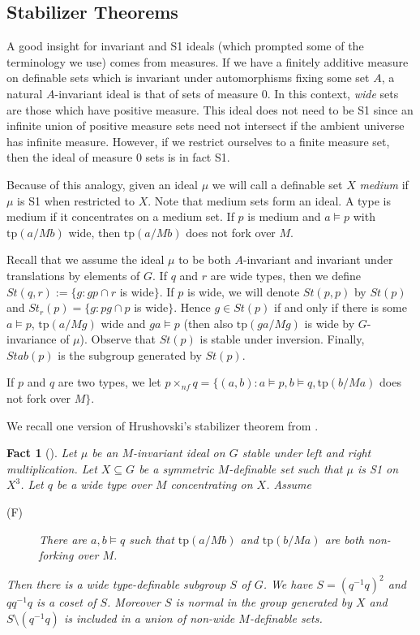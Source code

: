 \documentclass[12pt]{article}
\newtheorem{fact}[thm]{Fact}
\theoremstyle{definition}
\theoremstyle{mystyle}
\theoremstyle{remark}
\newcommand{\tp}{\mathrm{tp}}
\newcommand{\nf}{\times_{nf}}
\begin{document}
\subsection{Stabilizer Theorems}


A good insight for invariant and S1 ideals (which prompted some of
the terminology we use) comes from measures. If we have a finitely
additive measure on definable sets which is invariant under
automorphisms fixing some set $A$, a natural $A$-invariant ideal
is that of sets of measure 0. In this context, \emph{wide} sets
are those which have positive measure. This ideal does not need to
be S1 since an infinite union of positive measure sets need not
intersect if the ambient universe has infinite measure. However,
if we restrict ourselves to a finite measure set, then the ideal
of measure 0 sets is in fact S1.

Because of this analogy, given an ideal $\mu$ we will call a definable set $X$ \emph{medium}
if  $\mu$ is S1 when restricted to $X$. Note that medium sets form an ideal.
A type is medium if it concentrates on a medium set. If
$p$ is medium and $a\models p$ with
$\tp(a/Mb)$ wide, then $\tp(a/Mb)$ does not fork over $M$.

\bigskip

Recall that we assume the ideal $\mu$
to be both $A$-invariant and invariant under translations by elements of $G$.
If $q$ and $r$ are wide types, then we define $St(q,r):=\{g : gp
\cap r$ is wide$\}$. If $p$ is wide, we will denote $St(p,p)$ by
$St(p)$ and $St_r(p)= \{g : pg\cap p$ is wide$\}$. Hence $g\in
St(p)$ if and only if there is some $a\models p$, $\tp(a/Mg)$ wide
and $ga\models p$ (then also $\tp(ga/Mg)$ is wide by
$G$-invariance of $\mu$). Observe that $St(p)$ is stable under
inversion. Finally, $Stab(p)$ is the subgroup generated by
$St(p)$.

If $p$ and $q$ are two types, we let $p\nf q=\{(a,b) : a\models p, b\models q, \tp(b/Ma)$ does not fork over $M\}$.

\smallskip
We recall one version of Hrushovski's stabilizer theorem from
\cite{Hru12}.

\begin{fact}[\cite{Hru12}]\label{fact_stab}
Let $\mu$ be an $M$-invariant ideal on $G$ stable under left and right multiplication. Let $X\subseteq G$ be a symmetric $M$-definable set such that $\mu$ is S1 on $X^3$. Let $q$ be a wide type over $M$ concentrating on $X$. Assume

\begin{description}
\item[(F)] There are $a,b \models q$ such that $\tp(a/Mb)$ and $\tp(b/Ma)$ are both non-forking over $M$.
\end{description}
Then there is a wide type-definable subgroup $S$ of $G$. We have $S=(q^{-1}q)^2$ and $qq^{-1}q$ is a coset of $S$. Moreover $S$ is normal in the group generated by $X$ and $S\setminus (q^{-1}q)$ is included in a union of non-wide $M$-definable sets.
\end{fact}
\end{document}
